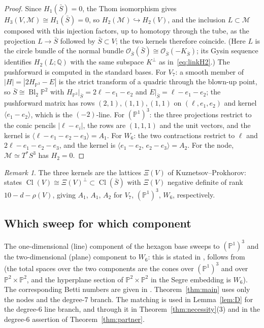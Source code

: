 \documentclass[11pt]{amsart}
\theoremstyle{definition}
\theoremstyle{remark}
\newtheorem{remark}[theorem]{Remark}
\theoremstyle{plain}
\newcommand{\QQ}{\mathbb{Q}}
\newcommand{\PP}{\mathbb{P}}
\newcommand{\cO}{\mathcal{O}}
\newcommand{\Mil}{\mathcal{M}}  %
\newcommand{\Cl}{\operatorname{Cl}}
\newcommand{\Bl}{\operatorname{Bl}}
\newcommand{\Sb}{\bar{S}}
\begin{document}
\begin{proof}
Since $H_1(\Sb)=0$, the Thom
isomorphism gives $H_3(V,\Mil)\cong H_1(\Sb)=0$, so
$H_2(\Mil)\hookrightarrow H_2(V)$, and the inclusion $L\subset \Mil$
composed with this injection factors, up to homotopy through the
tube, as the projection $L\to\Sb$ followed by $\Sb\subset V$; the two
kernels therefore coincide.  (Here $L$ is the circle bundle of the
normal bundle $\cO_{\Sb}(\Sb)\cong\cO_{\Sb}(-K_{\Sb})$; its Gysin
sequence identifies $H_2(L;\QQ)$ with the same subspace $K^{\perp}$ as
in~\eqref{eq:linkH2}.)  The pushforward is computed in the
standard bases.  For $V_7$: a smooth member of $|H|=|2H_{\PP^3}-E|$
is the strict transform of a quadric through the blown-up point, so
$\Sb\cong\Bl_2\PP^2$ with $H_{\PP^3}|_{\Sb}=2\ell-e_1-e_2$ and
$E|_{\Sb}=\ell-e_1-e_2$; the pushforward matrix has rows
$(2,1),(1,1),(1,1)$ on $(\ell,e_1,e_2)$ and kernel
$\langle e_1-e_2\rangle$, which is the $(-2)$-line.  For
$(\PP^1)^3$: the three projections restrict to the conic pencils
$|\ell-e_i|$, the rows are $(1,1,1)$ and the unit vectors, and the
kernel is $\langle\ell-e_1-e_2-e_3\rangle=A_1$.  For $W_6$: the two
contractions restrict to $\ell$ and $2\ell-e_1-e_2-e_3$, and the
kernel is $\langle e_1-e_2,\,e_2-e_3\rangle=A_2$.  For the node,
$\Mil\simeq T^*S^3$ has $H_2=0$.
\end{proof}

\begin{remark}\label{rem:xi}
The three kernels are the lattices $\Xi(V)$ of
Kuznetsov--Prokhorov: \cite[Theorem~1.9(i)]{KP23} states
$\Cl(V)\cong\Xi(V)^{\perp}\subset\Cl(\Sb)$ with $\Xi(V)$ negative
definite of rank $10-d-\rho(V)$, giving $A_1$, $A_1$, $A_2$ for
$V_7$, $(\PP^1)^3$, $W_6$, respectively.
\end{remark}

\subsection{Which sweep for which component}\label{sec:match}
The one-dimensional (line) component of the hexagon base sweeps to
$(\PP^1)^3$ and the two-dimensional (plane) component to $W_6$: this is
stated in \cite[Proposition~2.2]{Petracci20}, follows from
\cite[(7.1.5)]{Altmann95} (the total spaces over the two components are
the cones over $(\PP^1)^3$ and over $\PP^2\times\PP^2$, and the
hyperplane section of $\PP^2\times\PP^2$ in the Segre embedding is $W_6$).
The corresponding Betti numbers are given in
\cite[Proposition~3.5]{KP21}.  Theorem~\ref{thm:main} uses only the
nodes and the degree-$7$ branch.  The matching is used in
Lemma~\ref{lem:D} for the degree-$6$ line branch, and through it in
Theorem~\ref{thm:necessity}(3) and in the degree-$6$ assertion of
Theorem~\ref{thm:partner}.
\end{document}
